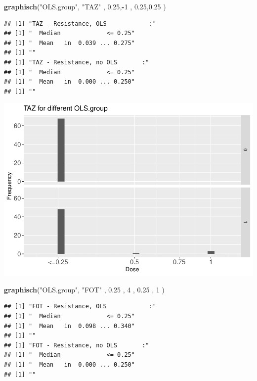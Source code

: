 \documentclass[
]{article}
\newenvironment{Shaded}{\begin{snugshade}}{\end{snugshade}}
\newcommand{\DecValTok}[1]{\textcolor[rgb]{0.00,0.00,0.81}{#1}}
\newcommand{\FloatTok}[1]{\textcolor[rgb]{0.00,0.00,0.81}{#1}}
\newcommand{\KeywordTok}[1]{\textcolor[rgb]{0.13,0.29,0.53}{\textbf{#1}}}
\newcommand{\NormalTok}[1]{#1}
\newcommand{\OperatorTok}[1]{\textcolor[rgb]{0.81,0.36,0.00}{\textbf{#1}}}
\newcommand{\StringTok}[1]{\textcolor[rgb]{0.31,0.60,0.02}{#1}}
\begin{document}
\begin{Shaded}
\begin{Highlighting}[]
  \KeywordTok{graphisch}\NormalTok{(}\StringTok{"OLS.group"}\NormalTok{, }\StringTok{"TAZ"}\NormalTok{ , }\FloatTok{0.25}\NormalTok{,}\OperatorTok{-}\DecValTok{1}\NormalTok{   ,   }\FloatTok{0.25}\NormalTok{,}\FloatTok{0.25}\NormalTok{ )  }
\end{Highlighting}
\end{Shaded}

\begin{verbatim}
## [1] "TAZ - Resistance, OLS            :"
## [1] "  Median             <= 0.25"
## [1] "  Mean   in  0.039 ... 0.275"
## [1] ""
## [1] "TAZ - Resistance, no OLS       :"
## [1] "  Median             <= 0.25"
## [1] "  Mean   in  0.000 ... 0.250"
## [1] ""
\end{verbatim}

\includegraphics{Verteilungen_files/figure-latex/unnamed-chunk-24-1.pdf}

\begin{Shaded}
\begin{Highlighting}[]
  \KeywordTok{graphisch}\NormalTok{(}\StringTok{"OLS.group"}\NormalTok{, }\StringTok{"FOT"}\NormalTok{ , }\FloatTok{0.25}\NormalTok{ ,   }\DecValTok{4}\NormalTok{   ,   }\FloatTok{0.25}\NormalTok{ ,   }\DecValTok{1}\NormalTok{     )  }
\end{Highlighting}
\end{Shaded}

\begin{verbatim}
## [1] "FOT - Resistance, OLS            :"
## [1] "  Median             <= 0.25"
## [1] "  Mean   in  0.098 ... 0.340"
## [1] ""
## [1] "FOT - Resistance, no OLS       :"
## [1] "  Median             <= 0.25"
## [1] "  Mean   in  0.000 ... 0.250"
## [1] ""
\end{verbatim}
\end{document}
